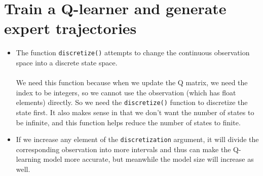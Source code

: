 \documentclass{article}
\begin{document}
    \section{Train a Q-learner and generate expert trajectories}
    \begin{itemize}
    	\item 
    	The function \verb|discretize()| attempts to change the continuous observation space into a discrete state space.\\\\
    	We need this function because when we update the Q matrix, we need the index to be integers, so we cannot use the observation (which has float elements) directly. So we need the \verb|discretize()| function to discretize the state first. It also makes sense in that we don't want the number of states to be infinite, and this function helps reduce the number of states to finite. 
    	\item
    	If we increase any element of the \verb|discretization| argument, it will divide the corresponding observation into more intervals and thus can make the Q-learning model more accurate, but meanwhile the model size will increase as well.
    \end{itemize}    
       
\end{document}

